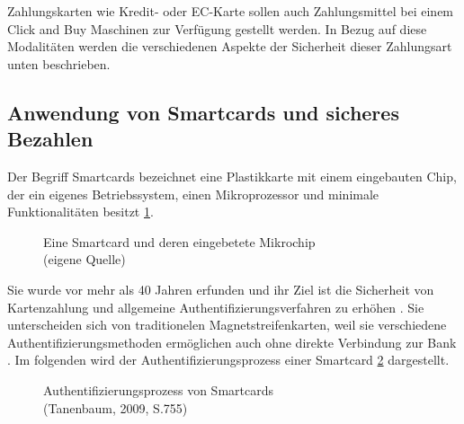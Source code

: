 Zahlungskarten wie Kredit- oder EC-Karte sollen auch Zahlungsmittel bei einem Click and Buy Maschinen
zur Verfügung gestellt werden. In Bezug auf diese Modalitäten werden die verschiedenen Aspekte der 
Sicherheit dieser Zahlungsart unten beschrieben.


\subsection{Anwendung von Smartcards und sicheres Bezahlen}
Der Begriff Smartcards bezeichnet eine Plastikkarte mit einem eingebauten Chip, der ein eigenes Betriebssystem,
einen Mikroprozessor und minimale Funktionalitäten besitzt \ref{fig:eigenes_Bild}. 

\vfill
\begin{figure}[htb]
   \caption{Eine Smartcard und deren eingebetete Mikrochip\\(eigene Quelle)}
   \label{fig:eigenes_Bild}
\end{figure}
\vfill

Sie wurde vor mehr als 40 Jahren erfunden und ihr Ziel ist die Sicherheit von Kartenzahlung und allgemeine
Authentifizierungsverfahren zu erhöhen \cite{refip:JFSB}. Sie unterscheiden sich von traditionelen 
Magnetstreifenkarten, weil sie verschiedene Authentifizierungsmethoden ermöglichen auch ohne direkte 
Verbindung zur Bank \cite{refbook:ATMS}. Im folgenden wird der Authentifizierungsprozess einer Smartcard 
\ref{fig:refbook_ATMS} dargestellt. 


\begin{figure}[H]
   \caption{Authentifizierungsprozess von Smartcards\\(Tanenbaum, 2009, S.755)}
   \label{fig:refbook_ATMS}
\end{figure}


